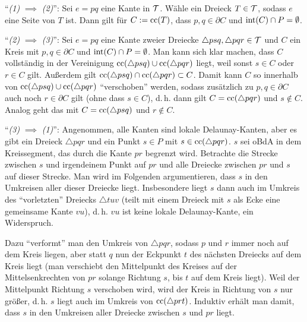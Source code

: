 \begin{Beweis}
    "`\emph{(1)} $\implies$ \emph{(2)}"':
    Sei $e = pq$ eine Kante in $\mathcal{T}$.
    Wähle ein Dreieck $T \in \mathcal{T}$, sodass $e$ eine Seite von $T$ ist.
    Dann gilt für $C := \operatorname{cc}(T)$, dass $p, q \in \partial C$ und $\operatorname{int}(C) \cap P = \emptyset$.

    "`\emph{(2)} $\implies$ \emph{(3)}"':
    Sei $e = pq$ eine Kante zweier Dreiecke $\triangle psq, \triangle pqr \in \mathcal{T}$
    und $C$ ein Kreis mit $p, q \in \partial C$ und $\operatorname{int}(C) \cap P = \emptyset$.
    Man kann sich klar machen, dass $C$ vollständig in der Vereinigung
    $\operatorname{cc}(\triangle psq) \cup \operatorname{cc}(\triangle pqr)$ liegt, weil sonst $s \in C$ oder $r \in C$ gilt.
    Außerdem gilt $\operatorname{cc}(\triangle psq) \cap \operatorname{cc}(\triangle pqr) \subset C$.
    Damit kann $C$ so innerhalb von $\operatorname{cc}(\triangle psq) \cup \operatorname{cc}(\triangle pqr)$ "`verschoben"'
    werden, sodass zusätzlich zu $p, q \in \partial C$ auch noch $r \in \partial C$ gilt
    (ohne dass $s \in C$), d.\,h. dann gilt $C = \operatorname{cc}(\triangle pqr)$ und $s \notin C$.
    Analog geht das mit $C = \operatorname{cc}(\triangle psq)$ und $r \notin C$.

    "`\emph{(3)} $\implies$ \emph{(1)}"':
    Angenommen, alle Kanten sind lokale Delaunay-Kanten, aber es gibt ein Dreieck $\triangle pqr$
    und ein Punkt $s \in P$ mit $s \in \operatorname{cc}(\triangle pqr)$.
    $s$ sei oBdA in dem Kreissegment, das durch die Kante $pr$ begrenzt wird.
    Betrachte die Strecke zwischen $s$ und irgendeinem Punkt auf $pr$ und
    alle Dreiecke zwischen $pr$ und $s$ auf dieser Strecke.
    Man wird im Folgenden argumentieren, dass $s$ in den Umkreisen aller dieser Dreiecke liegt.
    Insbesondere liegt $s$ dann auch im Umkreis des "`vorletzten"' Dreiecks $\triangle tuv$
    (teilt mit einem Dreieck mit $s$ als Ecke eine gemeinsame Kante $vu$),
    d.\,h. $vu$ ist keine lokale Delaunay-Kante, ein Widerspruch.

    Dazu "`verformt"' man den Umkreis von $\triangle pqr$, sodass $p$ und $r$ immer noch auf dem
    Kreis liegen, aber statt $q$ nun der Eckpunkt $t$ des nächsten Dreiecks auf dem Kreis liegt
    (man verschiebt den Mittelpunkt des Kreises auf der Mittelsenkrechten von $pr$ solange
    Richtung $s$, bis $t$ auf dem Kreis liegt).
    Weil der Mittelpunkt Richtung $s$ verschoben wird, wird der Kreis in Richtung von $s$ nur
    größer, d.\,h. $s$ liegt auch im Umkreis von $\operatorname{cc}(\triangle prt)$.
    Induktiv erhält man damit, dass $s$ in den Umkreisen aller Dreiecke zwischen $s$ und $pr$
    liegt.
\end{Beweis}

